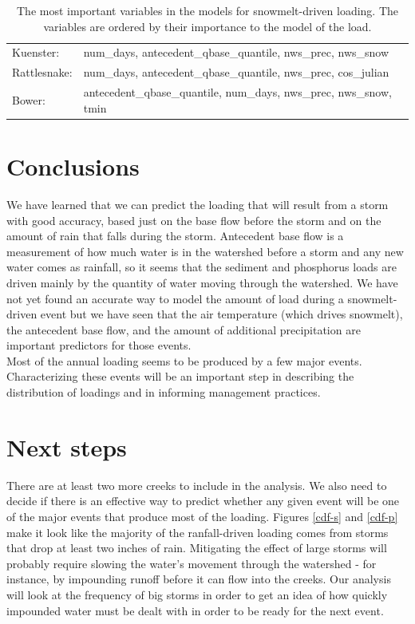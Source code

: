 \documentclass[10pt]{article}
\begin{document}
\begin{table}[h!]
\begin{center}
\begin{tabular}{ll}
        \hspace{5mm} Kuenster: & num\_days, antecedent\_qbase\_quantile, nws\_prec, nws\_snow\\
        \hspace{5mm} Rattlesnake: & num\_days, antecedent\_qbase\_quantile, nws\_prec, cos\_julian\\
        \hspace{5mm} Bower: & antecedent\_qbase\_quantile, num\_days, nws\_prec, nws\_snow, tmin\\
    \end{tabular}
    \caption{The most important variables in the models for snowmelt-driven loading. The variables are ordered by their importance to the model of the load. \label{snow_predictor_list}}
    \end{center}
\end{table}

\section{Conclusions}
We have learned that we can predict the loading that will result from a storm with good accuracy, based just on the base flow before the storm and on the amount of rain that falls during the storm. Antecedent base flow is a measurement of how much water is in the watershed before a storm and any new water comes as rainfall, so it seems that the sediment and phosphorus loads are driven mainly by the quantity of water moving through the watershed. We have not yet found an accurate way to model the amount of load during a snowmelt-driven event but we have seen that the air temperature (which drives snowmelt), the antecedent base flow, and the amount of additional precipitation are important predictors for those events.\\

Most of the annual loading seems to be produced by a few major events. Characterizing these events will be an important step in describing the distribution of loadings and in informing management practices.\\

\section{Next steps}
There are at least two more creeks to include in the analysis. We also need to decide if there is an effective way to predict whether any given event will be one of the major events that produce most of the loading. Figures \ref{cdf-s} and \ref{cdf-p} make it look like the majority of the ranfall-driven loading comes from storms that drop at least two inches of rain. Mitigating the effect of large storms will probably require slowing the water's movement through the watershed - for instance, by impounding runoff before it can flow into the creeks. Our analysis will look at the frequency of big storms in order to get an idea of how quickly impounded water must be dealt with in order to be ready for the next event.
\end{document}
